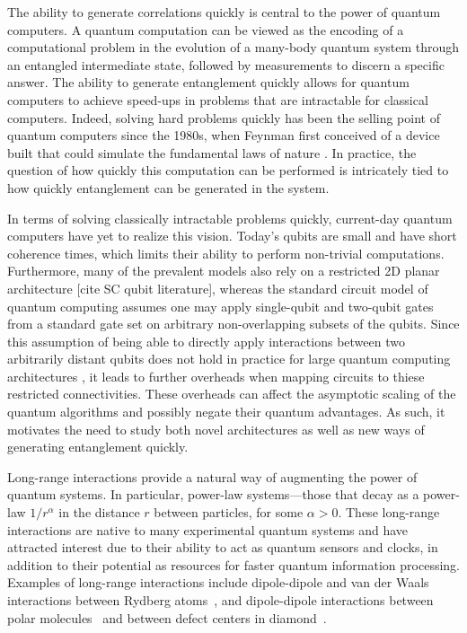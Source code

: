 
The ability to generate correlations quickly is central to the power of quantum computers.
A quantum computation can be viewed as the encoding of a computational problem in the evolution of a many-body quantum system through an entangled intermediate state, followed by measurements to discern a specific answer.
The ability to generate entanglement quickly allows for quantum computers to achieve speed-ups in problems that are intractable for classical computers.
Indeed, solving hard problems quickly has been the selling point of quantum computers since the 1980s, when Feynman first conceived of a device built that could simulate the fundamental laws of nature \cite{Feynman}.
In practice, the question of how quickly this computation can be performed is intricately tied to how quickly entanglement can be generated in the system.

In terms of solving classically intractable problems quickly, current-day quantum computers have yet to realize this vision.
Today's qubits are small and have short coherence times, which limits their ability to perform non-trivial computations.
Furthermore, many of the prevalent models also rely on a restricted 2D planar architecture [cite SC qubit literature], whereas the standard circuit model of quantum computing assumes one may apply single-qubit and two-qubit gates from a standard gate set on arbitrary non-overlapping subsets of the qubits.
Since this assumption of being able to directly apply interactions between two arbitrarily distant qubits does not hold in practice for large quantum computing architectures \cite{Monroe2014,Linke2017,Bapat2018,Childs2019c,Schoute2022}, it leads to further overheads when mapping circuits to thiese restricted connectivities.
These overheads can affect the asymptotic scaling of the quantum algorithms and possibly negate their quantum advantages.
As such, it motivates the need to study both novel architectures as well as new ways of generating entanglement quickly.

Long-range interactions provide a natural way of augmenting the power of quantum systems.
In particular, power-law systems---those that decay as a power-law $1/r^\alpha$ in the distance  $r$ between particles, for some $\alpha > 0$.
These long-range interactions are native to many experimental quantum systems and have attracted interest due to their ability to act as quantum sensors and clocks, in addition to their potential as resources for faster quantum information processing. Examples of long-range interactions include dipole-dipole and van der Waals interactions between Rydberg atoms~\cite{Saffman2010,Weimer2012}, and dipole-dipole interactions between polar molecules~\cite{Yan2013} and between defect centers in diamond~\cite{Yao2012,Weimer2012}.

